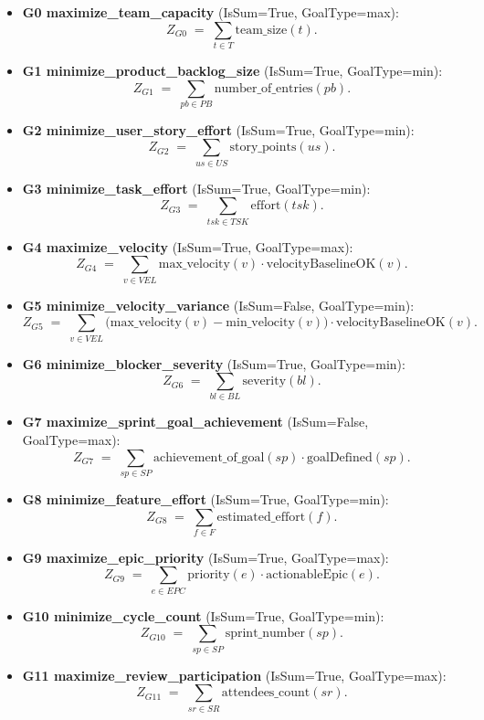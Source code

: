 \documentclass[11pt,a4paper]{article}
\begin{document}
\begin{itemize}[leftmargin=2em,label=\(\triangleright\)]
  \item \textbf{G0 maximize\_team\_capacity} (IsSum{=}True, GoalType{=}max):
  \[
  Z_{G0} \;=\; \sum_{t \in T} \text{team\_size}(t).
  \]
  \item \textbf{G1 minimize\_product\_backlog\_size} (IsSum{=}True, GoalType{=}min):
  \[
  Z_{G1} \;=\; \sum_{pb \in PB} \text{number\_of\_entries}(pb).
  \]
  \item \textbf{G2 minimize\_user\_story\_effort} (IsSum{=}True, GoalType{=}min):
  \[
  Z_{G2} \;=\; \sum_{us \in US} \text{story\_points}(us).
  \]
  \item \textbf{G3 minimize\_task\_effort} (IsSum{=}True, GoalType{=}min):
  \[
  Z_{G3} \;=\; \sum_{tsk \in TSK} \text{effort}(tsk).
  \]
  \item \textbf{G4 maximize\_velocity} (IsSum{=}True, GoalType{=}max):
  \[
  Z_{G4} \;=\; \sum_{v \in VEL} \text{max\_velocity}(v) \cdot \text{velocityBaselineOK}(v).
  \]
  \item \textbf{G5 minimize\_velocity\_variance} (IsSum{=}False, GoalType{=}min):
  \[
  Z_{G5} \;=\; \sum_{v \in VEL} \big(\text{max\_velocity}(v) - \text{min\_velocity}(v)\big) \cdot \text{velocityBaselineOK}(v).
  \]
  \item \textbf{G6 minimize\_blocker\_severity} (IsSum{=}True, GoalType{=}min):
  \[
  Z_{G6} \;=\; \sum_{bl \in BL} \text{severity}(bl).
  \]
  \item \textbf{G7 maximize\_sprint\_goal\_achievement} (IsSum{=}False, GoalType{=}max):
  \[
  Z_{G7} \;=\; \sum_{sp \in SP} \text{achievement\_of\_goal}(sp) \cdot \text{goalDefined}(sp).
  \]
  \item \textbf{G8 minimize\_feature\_effort} (IsSum{=}True, GoalType{=}min):
  \[
  Z_{G8} \;=\; \sum_{f \in F} \text{estimated\_effort}(f).
  \]
  \item \textbf{G9 maximize\_epic\_priority} (IsSum{=}True, GoalType{=}max):
  \[
  Z_{G9} \;=\; \sum_{e \in EPC} \text{priority}(e) \cdot \text{actionableEpic}(e).
  \]
  \item \textbf{G10 minimize\_cycle\_count} (IsSum{=}True, GoalType{=}min):
  \[
  Z_{G10} \;=\; \sum_{sp \in SP} \text{sprint\_number}(sp).
  \]
  \item \textbf{G11 maximize\_review\_participation} (IsSum{=}True, GoalType{=}max):
  \[
  Z_{G11} \;=\; \sum_{sr \in SR} \text{attendees\_count}(sr).
  \]
\end{itemize}
\end{document}
